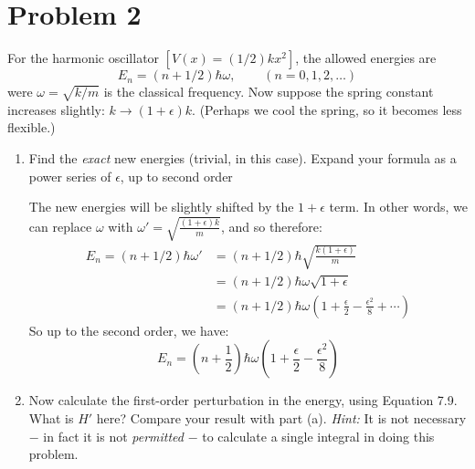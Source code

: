 \documentclass[10pt]{article}
\begin{document}
    \pagebreak 
    \section*{Problem 2}
    For the harmonic oscillator $[V(x) = (1/2)kx^2]$, the allowed energies are 
    \[ E_n = (n + 1/2)\hbar \omega, \phantom{aaaa} (n = 0, 1, 2, \dots)\]
    were $\omega = \sqrt{k/m}$ is the classical frequency. Now suppose the spring constant increases slightly: $k \to (1 + \epsilon) k$. (Perhaps we cool the spring, so it becomes less flexible.)
    \begin{enumerate}[label=(\alph*)]
        \item Find the \textit{exact} new energies (trivial, in this case). Expand your formula as a power series of $\epsilon$, up to second order
        
        \begin{solution}
            The new energies will be slightly shifted by the $1 + \epsilon$ term. In other words, we can replace $\omega$ with $\omega' = \sqrt{\frac{(1 + \epsilon)k}{m}}$, and so therefore: 
            \begin{align*}
                E_n = (n + 1/2) \hbar \omega' &= (n + 1/2) \hbar \sqrt{\frac{k(1 + \epsilon)}{m}}\\
                &=(n + 1/2)\hbar \omega \sqrt{1 + \epsilon}\\
                &= (n + 1/2) \hbar \omega \left( 1 + \frac \epsilon 2 - \frac{\epsilon^2}{8} + \cdots\right)
            \end{align*}
            So up to the second order, we have:
            \[ E_n = \left(n + \frac 12\right) \hbar \omega(1 + \frac \epsilon 2 - \frac{\epsilon^2}{8})\]
        \end{solution}
        \item Now calculate the first-order perturbation in the energy, using Equation 7.9. What is $H'$ here? Compare your result with part (a). \textit{Hint:} It is not necessary $-$ in fact it is not \textit{permitted} $-$ to calculate a single integral in doing this problem.
        

\end{enumerate}
\end{document}
